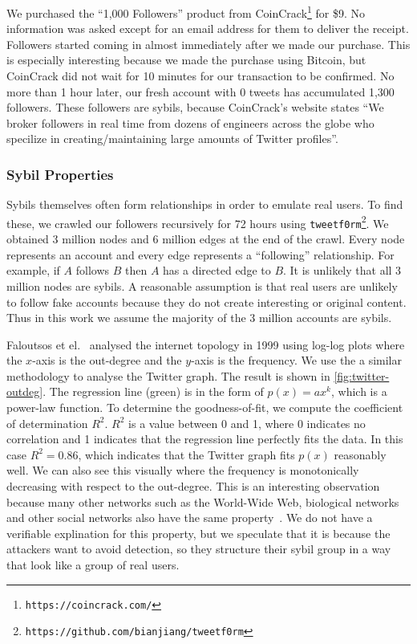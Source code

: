 We purchased the ``1,000 Followers'' product from
CoinCrack\footnote{\texttt{https://coincrack.com/}} for \$9. No information was
asked except for an email address for them to deliver the receipt. Followers
started coming in almost immediately after we made our purchase. This is
especially interesting because we made the purchase using Bitcoin, but CoinCrack
did not wait for 10 minutes for our transaction to be confirmed. No more than 1
hour later, our fresh account with 0 tweets has accumulated 1,300 followers.
These followers are sybils, because CoinCrack's website states ``We broker
followers in real time from dozens of engineers across the globe who specilize
in creating/maintaining large amounts of Twitter profiles''.

\subsubsection{Sybil Properties}
Sybils themselves often form relationships in order to emulate real users. To
find these, we crawled our followers recursively for 72 hours using
\verb!tweetf0rm!\footnote{\texttt{https://github.com/bianjiang/tweetf0rm}}. We
obtained 3 million nodes and 6 million edges at the end of the crawl. Every node
represents an account and every edge represents a ``following'' relationship.
For example, if $A$ follows $B$ then $A$ has a directed edge to $B$. It is
unlikely that all 3 million nodes are sybils. A reasonable assumption is that
real users are unlikely to follow fake accounts because they do not create
interesting or original content. Thus in this work we assume the majority of the
3 million accounts are sybils.

Faloutsos et el.~\cite{faloutsos1999power} analysed the internet topology in
1999 using log-log plots where the $x$-axis is the out-degree and the $y$-axis
is the frequency. We use the a similar methodology to analyse the Twitter graph.
The result is shown in \autoref{fig:twitter-outdeg}. The regression line (green)
is in the form of $p(x) = ax^k$, which is a power-law function. To determine the
goodness-of-fit, we compute the coefficient of determination $R^2$. $R^2$ is a
value between 0 and 1, where 0 indicates no correlation and 1 indicates that the
regression line perfectly fits the data. In this case $R^2 = 0.86$, which
indicates that the Twitter graph fits $p(x)$ reasonably well. We can also see
this visually where the frequency is monotonically decreasing with respect to
the out-degree. This is an interesting observation because many other networks
such as the World-Wide Web, biological networks and other social networks also
have the same property~\cite{faloutsos1999power, girvan2002community}. We do not
have a verifiable explination for this property, but we speculate that it is
because the attackers want to avoid detection, so they structure their sybil
group in a way that look like a group of real users.

